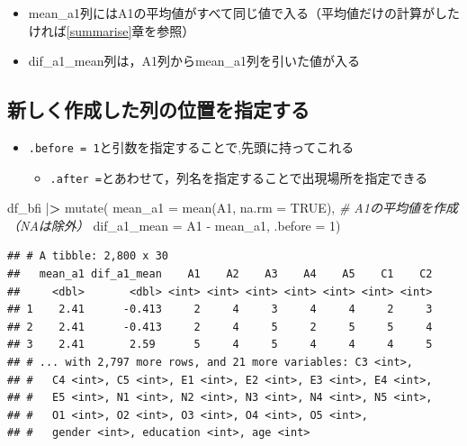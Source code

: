 \documentclass[
  xelatex,ja=standard, b5paper]{bxjsbook}
\newenvironment{Shaded}{\begin{snugshade}}{\end{snugshade}}
\newcommand{\AttributeTok}[1]{\textcolor[rgb]{0.77,0.63,0.00}{#1}}
\newcommand{\CommentTok}[1]{\textcolor[rgb]{0.56,0.35,0.01}{\textit{#1}}}
\newcommand{\ConstantTok}[1]{\textcolor[rgb]{0.00,0.00,0.00}{#1}}
\newcommand{\DecValTok}[1]{\textcolor[rgb]{0.00,0.00,0.81}{#1}}
\newcommand{\ErrorTok}[1]{\textcolor[rgb]{0.64,0.00,0.00}{\textbf{#1}}}
\newcommand{\FunctionTok}[1]{\textcolor[rgb]{0.00,0.00,0.00}{#1}}
\newcommand{\NormalTok}[1]{#1}
\newcommand{\SpecialCharTok}[1]{\textcolor[rgb]{0.00,0.00,0.00}{#1}}
\providecommand{\tightlist}{%
  \setlength{\itemsep}{0pt}\setlength{\parskip}{0pt}}
\begin{document}
\begin{itemize}
\tightlist
\item
  mean\_a1列にはA1の平均値がすべて同じ値で入る（平均値だけの計算がしたければ\ref{summarise}章を参照）
\item
  dif\_a1\_mean列は，A1列からmean\_a1列を引いた値が入る
\end{itemize}

\hypertarget{ux65b0ux3057ux304fux4f5cux6210ux3057ux305fux5217ux306eux4f4dux7f6eux3092ux6307ux5b9aux3059ux308b}{%
\subsection{新しく作成した列の位置を指定する}\label{ux65b0ux3057ux304fux4f5cux6210ux3057ux305fux5217ux306eux4f4dux7f6eux3092ux6307ux5b9aux3059ux308b}}

\begin{itemize}
\tightlist
\item
  \texttt{.before\ =\ 1}と引数を指定することで,先頭に持ってこれる

  \begin{itemize}
  \tightlist
  \item
    \texttt{.after\ =}とあわせて，列名を指定することで出現場所を指定できる
  \end{itemize}
\end{itemize}

\begin{Shaded}
\begin{Highlighting}[]
\NormalTok{df\_bfi }\SpecialCharTok{|}\ErrorTok{\textgreater{}} 
  \FunctionTok{mutate}\NormalTok{(}
    \AttributeTok{mean\_a1 =} \FunctionTok{mean}\NormalTok{(A1, }\AttributeTok{na.rm =} \ConstantTok{TRUE}\NormalTok{), }\CommentTok{\# A1の平均値を作成（NAは除外）}
    \AttributeTok{dif\_a1\_mean =}\NormalTok{ A1 }\SpecialCharTok{{-}}\NormalTok{ mean\_a1,}
    \AttributeTok{.before =} \DecValTok{1}\NormalTok{) }
\end{Highlighting}
\end{Shaded}

\begin{verbatim}
## # A tibble: 2,800 x 30
##   mean_a1 dif_a1_mean    A1    A2    A3    A4    A5    C1    C2
##     <dbl>       <dbl> <int> <int> <int> <int> <int> <int> <int>
## 1    2.41      -0.413     2     4     3     4     4     2     3
## 2    2.41      -0.413     2     4     5     2     5     5     4
## 3    2.41       2.59      5     4     5     4     4     4     5
## # ... with 2,797 more rows, and 21 more variables: C3 <int>,
## #   C4 <int>, C5 <int>, E1 <int>, E2 <int>, E3 <int>, E4 <int>,
## #   E5 <int>, N1 <int>, N2 <int>, N3 <int>, N4 <int>, N5 <int>,
## #   O1 <int>, O2 <int>, O3 <int>, O4 <int>, O5 <int>,
## #   gender <int>, education <int>, age <int>
\end{verbatim}
\end{document}
